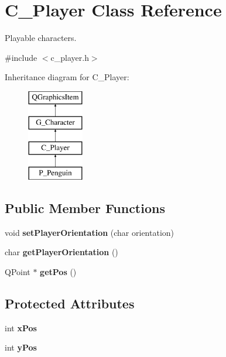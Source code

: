 \hypertarget{class_c___player}{}\section{C\+\_\+\+Player Class Reference}
\label{class_c___player}


Playable characters.  




{\ttfamily \#include $<$c\+\_\+player.\+h$>$}

Inheritance diagram for C\+\_\+\+Player\+:\begin{figure}[H]
\begin{center}
\leavevmode
\includegraphics[height=4.000000cm]{class_c___player}
\end{center}
\end{figure}
\subsection*{Public Member Functions}
\begin{DoxyCompactItemize}
\item 
\hypertarget{class_c___player_abd5bea3e1df50d838ad49582fbba479a}{}void {\bfseries set\+Player\+Orientation} (char orientation)\label{class_c___player_abd5bea3e1df50d838ad49582fbba479a}

\item 
\hypertarget{class_c___player_aa31e19b788c1c6368670fb94e5609e2d}{}char {\bfseries get\+Player\+Orientation} ()\label{class_c___player_aa31e19b788c1c6368670fb94e5609e2d}

\item 
\hypertarget{class_c___player_a1791dc6a4a378bea4f22766994b659ca}{}Q\+Point $\ast$ {\bfseries get\+Pos} ()\label{class_c___player_a1791dc6a4a378bea4f22766994b659ca}

\end{DoxyCompactItemize}
\subsection*{Protected Attributes}
\begin{DoxyCompactItemize}
\item 
\hypertarget{class_c___player_a2307a5ffc4d20962d4721976b197d173}{}int {\bfseries x\+Pos}\label{class_c___player_a2307a5ffc4d20962d4721976b197d173}

\item 
\hypertarget{class_c___player_a3da14c9af55d4c8e7cd2fb44498fd5f0}{}int {\bfseries y\+Pos}\label{class_c___player_a3da14c9af55d4c8e7cd2fb44498fd5f0}

\end{DoxyCompactItemize}


